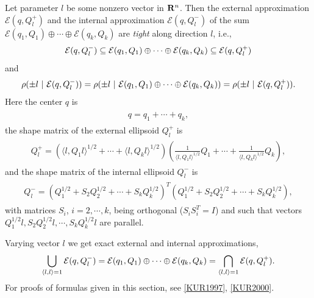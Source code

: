 \documentclass[letterpaper,10pt,english]{sphinxmanual}
\begin{document}
Let parameter $l$ be some nonzero vector in ${\bf R}^n$.
Then the external approximation ${\mathcal E}(q,Q_l^+)$ and the
internal approximation ${\mathcal E}(q,Q_l^-)$ of the sum
${\mathcal E}(q_1,Q_1)\oplus\cdots\oplus{\mathcal E}(q_k,Q_k)$ are
\emph{tight} along direction $l$, i.e.,
\begin{gather}
\begin{split}{\mathcal E}(q,Q_l^-)\subseteq{\mathcal E}(q_1,Q_1)\oplus\cdots\oplus{\mathcal E}(q_k,Q_k)
\subseteq{\mathcal E}(q,Q_l^+)\end{split}\notag
\end{gather}
and
\begin{gather}
\begin{split}\rho(\pm l ~|~ {\mathcal E}(q,Q_l^-)) =
\rho(\pm l ~|~ {\mathcal E}(q_1,Q_1)\oplus\cdots\oplus{\mathcal E}(q_k,Q_k)) =
\rho(\pm l ~|~ {\mathcal E}(q,Q_l^+)).\end{split}\notag
\end{gather}
Here the center $q$ is
\label{chap_ellcalc:equation-minksum_c}\begin{gather}
\begin{split}q = q_1 + \cdots + q_k ,\end{split}\label{chap_ellcalc-minksum_c}
\end{gather}
the shape matrix of the external ellipsoid $Q_l^+$ is
\label{chap_ellcalc:equation-minksum_ea}\begin{gather}
\begin{split}Q_l^+ = \left(\langle l,Q_1l\rangle^{1/2} + \cdots
+ \langle l,Q_kl\rangle^{1/2}\right)
\left(\frac{1}{\langle l,Q_1l\rangle^{1/2}}Q_1 + \cdots +
\frac{1}{\langle l,Q_kl\rangle^{1/2}}Q_k\right),\end{split}\label{chap_ellcalc-minksum_ea}
\end{gather}
and the shape matrix of the internal ellipsoid $Q_l^-$ is
\label{chap_ellcalc:equation-minksum_ia}\begin{gather}
\begin{split}Q_l^- = \left(Q_1^{1/2} + S_2Q_2^{1/2} + \cdots + S_kQ_k^{1/2}\right)^T
\left(Q_1^{1/2} + S_2Q_2^{1/2} + \cdots + S_kQ_k^{1/2}\right),\end{split}\label{chap_ellcalc-minksum_ia}
\end{gather}
with matrices $S_i$, $i=2,\cdots,k$, being orthogonal
($S_iS_i^T=I$) and such that vectors
$Q_1^{1/2}l, S_2Q_2^{1/2}l, \cdots, S_kQ_k^{1/2}l$ are parallel.

Varying vector $l$ we get exact external and internal
approximations,
\begin{gather}
\begin{split}\bigcup_{\langle l,l\rangle=1} {\mathcal E}(q,Q_l^-) =
{\mathcal E}(q_1,Q_1)\oplus\cdots\oplus{\mathcal E}(q_k,Q_k) =
\bigcap_{\langle l,l\rangle=1} {\mathcal E}(q,Q_l^+) .\end{split}\notag
\end{gather}
For proofs of formulas given in this section, see {\hyperref[chap_intro:kur1997]{{[}KUR1997{]}}}, {\hyperref[chap_intro:kur2000]{{[}KUR2000{]}}}.
\end{document}
